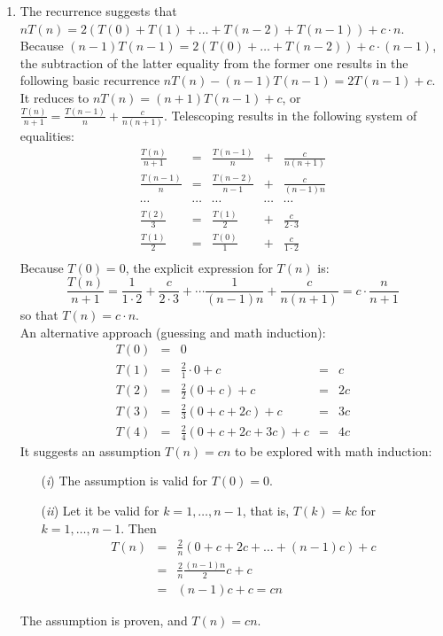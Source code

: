 \documentclass[]{article}
\begin{document}
\begin{enumerate}
\item
The recurrence suggests that 
$nT(n) = 2(T(0)+T(1)+\ldots +T(n-2)+T(n-1)) + c \cdot n$.
Because $(n-1)T(n-1) = 2(T(0)+\ldots +T(n-2)) + c \cdot (n-1)$, the
subtraction of the latter equality from the former one results in the
following basic recurrence $nT(n) - (n-1)T(n-1) = 2T(n-1) + c$. It
reduces to $nT(n) = (n+1)T(n-1) + c$, or 
$\frac{T(n)}{n+1} = \frac{T(n-1)}{n} + \frac{c}{n(n+1)}$.
Telescoping results in the following system of equalities:
\[
\begin{array}{lllll}
\frac{T(n)}{n+1} & = & \frac{T(n-1)}{n}  & +  & \frac{c}{n(n+1)}\\
\frac{T(n-1)}{n} & = & \frac{T(n-2)}{n-1}  & +  & \frac{c}{(n-1)n}\\
\cdots & \cdots & \cdots  &  \cdots & \cdots \\
\frac{T(2)}{3} & = & \frac{T(1)}{2}  & + & \frac{c}{2 \cdot 3} \\
\frac{T(1)}{2} & = & \frac{T(0)}{1}  & + & \frac{c}{1 \cdot 2} \\ 
\end{array}
\]
Because $T(0)=0$, the explicit expression for $T(n)$ is:
\[
\frac{T(n)}{n+1} = \frac{1}{1 \cdot 2} + \frac{c}{2 \cdot 3} + \cdots 
\frac{1}{(n-1)n} + \frac{c}{n(n+1)} = c \cdot \frac{n}{n+1}
\]
so that $T(n)= c \cdot n$.\\ 

An alternative approach (guessing and math induction): 
\[
\begin{array}{lllll}
T(0) & = & 0 & &\\
T(1) & = & \frac{2}{1} \cdot   0 + c & = & c\\
T(2) & = & \frac{2}{2} \left ( 0 + c \right ) + c & = & 2c\\
T(3) & = & \frac{2}{3} \left ( 0 + c + 2c  \right ) + c & = & 3c\\
T(4) & = & \frac{2}{4} \left ( 0+c+2c+3c \right ) + c & = & 4c
\end{array}
\] 
It suggests an assumption $T(n) = cn$ to be explored with
math induction:

\begin{enumerate}
\item[({\it i})] The assumption is valid for $T(0)=0$.
\item[({\it ii})] Let it be valid for $k=1,\ldots,n-1$, that is,
$T(k)=kc$ for $k=1,\ldots,n-1$. Then
\[
\begin{array}{lll}
T(n) & = & \frac{2}{n}\left ( 
0 + c + 2c + \ldots + (n-1)c
\right ) + c \\
&=& \frac{2}{n}\frac{(n-1)n}{2}c + c \\
&=& (n-1)c + c = cn
\end{array}
\]
\end{enumerate}
The assumption is proven, and $T(n)=cn$.


\end{enumerate}
\end{document}
